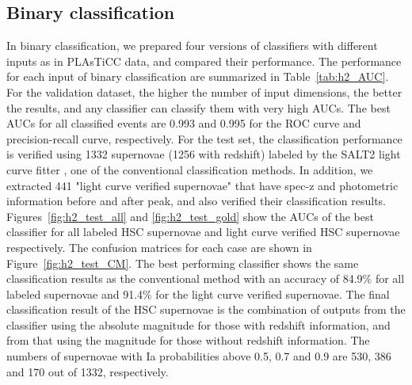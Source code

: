 \documentclass[useamsfonts]{pasj01}
\begin{document}
\subsection{Binary classification}
\label{sec:h2}
%
In binary classification, we prepared four versions of classifiers with different inputs as in PLAsTiCC data, and compared their performance.
The performance for each input of binary classification are summarized in Table\ \ref{tab:h2_AUC}.
For the validation dataset, the higher the number of input dimensions, the better the results, and any classifier can classify them with very high AUCs.
The best AUCs for all classified events are 0.993 and 0.995 for the ROC curve and precision-recall curve, respectively.
For the test set, the classification performance is verified using 1332 supernovae (1256 with redshift) labeled by the SALT2 light curve fitter \citep{guy2007,Guy_2010}, one of the conventional classification methods.
In addition, we extracted 441 "light curve verified supernovae" that have spec-z and photometric information before and after peak, and also verified their classification results.
Figures\ \ref{fig:h2_test_all} and \ref{fig:h2_test_gold} show the AUCs of the best classifier for all labeled HSC supernovae and light curve verified HSC supernovae respectively.
The confusion matrices for each case are shown in Figure\ \ref{fig:h2_test_CM}.
The best performing classifier shows the same classification results as the conventional method with an accuracy of 84.9\% for all labeled supernovae and 91.4\% for the light curve verified supernovae.
The final classification result of the HSC supernovae is the combination of outputs from the classifier using the absolute magnitude for those with redshift information, and from that using the magnitude for those without redshift information.
The numbers of supernovae with Ia probabilities above 0.5, 0.7 and 0.9 are 530, 386 and 170 out of 1332, respectively.
%
%
%
%
\end{document}
